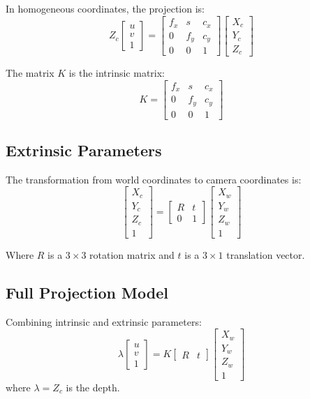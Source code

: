\documentclass{article}
\begin{document}
In homogeneous coordinates, the projection is:
\[
Z_c \begin{bmatrix} u \\ v \\ 1 \end{bmatrix} = \begin{bmatrix} 
f_x & s & c_x \\ 
0 & f_y & c_y \\ 
0 & 0 & 1 
\end{bmatrix} 
\begin{bmatrix} X_c \\ Y_c \\ Z_c \end{bmatrix}
\]

The matrix $K$ is the intrinsic matrix:
\[
K = \begin{bmatrix} 
f_x & s & c_x \\ 
0 & f_y & c_y \\ 
0 & 0 & 1 
\end{bmatrix}
\]

\subsection{Extrinsic Parameters}

The transformation from world coordinates to camera coordinates is:
\[
\begin{bmatrix}
X_c \\ Y_c \\ Z_c \\ 1
\end{bmatrix}
=
\begin{bmatrix}
R & t \\
0 & 1
\end{bmatrix}
\begin{bmatrix}
X_w \\ Y_w \\ Z_w \\ 1
\end{bmatrix}
\]

Where \( R \) is a \( 3 \times 3 \) rotation matrix and \( t \) is a \( 3 \times 1 \) translation vector.

\subsection{Full Projection Model}
Combining intrinsic and extrinsic parameters:
\[
\lambda
\begin{bmatrix}
u \\
v \\
1
\end{bmatrix}=
K
\begin{bmatrix}
R & t
\end{bmatrix}
\begin{bmatrix}
X_w \\
Y_w \\
Z_w \\
1
\end{bmatrix}
\]
where $\lambda = Z_c$ is the depth.
\end{document}
